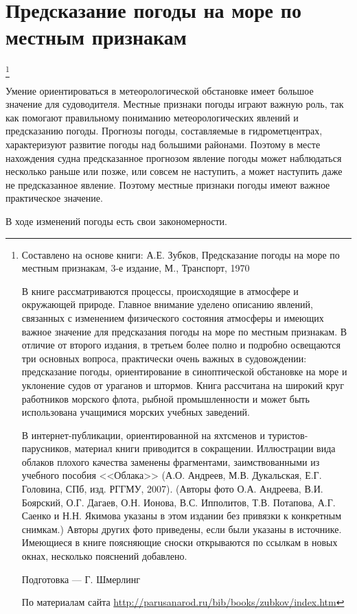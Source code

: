 \section{Предсказание погоды на море по местным признакам}\footnote{
Составлено на основе книги: А.Е. Зубков, Предсказание погоды на море
по местным признакам, 3-е издание, М., Транспорт, 1970

В книге рассматриваются процессы, происходящие в атмосфере и
окружающей природе. Главное внимание уделено описанию явлений,
связанных с изменением физического состояния атмосферы и имеющих
важное значение для предсказания погоды на море по местным
признакам. В отличие от второго издания, в третьем более полно и
подробно освещаются три основных вопроса, практически очень важных в
судовождении: предсказание погоды, ориентирование в синоптической
обстановке на море и уклонение судов от ураганов и штормов. Книга
рассчитана на широкий круг работников морского флота, рыбной
промышленности и может быть использована учащимися морских учебных
заведений.

В интернет-публикации, ориентированной на яхтсменов и
туристов-парусников, материал книги приводится в
сокращении. Иллюстрации вида облаков плохого качества заменены
фрагментами, заимствованными из учебного пособия <<Облака>>
(А.О. Андреев, М.В. Дукальская, Е.Г. Головина, СПб, изд. РГГМУ,
2007). (Авторы фото О.А. Андреева, В.И. Боярский, О.Г. Дагаев,
О.Н. Ионова, В.С. Ипполитов, Т.В. Потапова, А.Г. Саенко и Н.Н. Якимова
указаны в этом издании без привязки к конкретным снимкам.) Авторы
других фото приведены, если были указаны в источнике. Имеющиеся в
книге поясняющие сноски открываются по ссылкам в новых окнах,
несколько пояснений добавлено.

Подготовка --- Г. Шмерлинг

По материалам сайта \url{http://parusanarod.ru/bib/books/zubkov/index.htm}}

Умение ориентироваться в метеорологической обстановке имеет большое
значение для судоводителя. Местные признаки погоды играют важную роль,
так как помогают правильному пониманию метеорологических явлений и
предсказанию погоды. Прогнозы погоды, составляемые в гидрометцентрах,
характеризуют развитие погоды над большими районами. Поэтому в месте
нахождения судна предсказанное прогнозом явление погоды может
наблюдаться несколько раньше или позже, или совсем не наступить, а
может наступить даже не предсказанное явление. Поэтому местные
признаки погоды имеют важное практическое значение.

В ходе изменений погоды есть свои закономерности.

